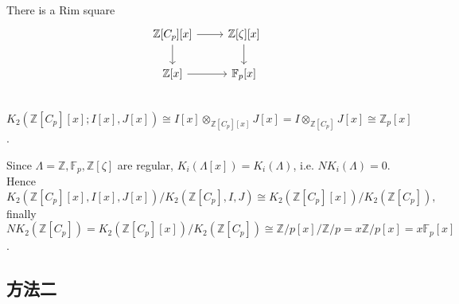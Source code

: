 {\begin{example}[{$\mathbb{Z}[C_p]$}]
\end{example}
\begin{example}[{$\mathbb{Z}[C_p][x]$}]
	There is a Rim square
		\[\begin{tikzcd}
			\mathbb{Z}[C_p][x] \ar[r] \ar[d]& \mathbb{Z}[\zeta][x]\ar[d]\\
			\mathbb{Z}[x] \ar[r] & \mathbb{F}_p[x]\\
		\end{tikzcd}\]
$K_2(\mathbb{Z}[C_p][x];I[x],J[x])\cong I[x]\otimes_{\mathbb{Z}[C_p][x]} J[x] =I\otimes_{\mathbb{Z}[C_p]} J[x]\cong \mathbb{Z}_p[x]$.

Since $\Lambda=\mathbb{Z}, \mathbb{F}_p, \mathbb{Z}[\zeta]$ are regular, $K_i(\Lambda[x]) = K_i(\Lambda)$, i.e. $NK_i(\Lambda)=0$. Hence 
\[K_2(\mathbb{Z}[C_p][x],I[x],J[x])/K_2(\mathbb{Z}[C_p],I,J)\cong K_2(\mathbb{Z}[C_p][x])/K_2(\mathbb{Z}[C_p]),\]
finally $NK_2(\mathbb{Z}[C_p]) = K_2(\mathbb{Z}[C_p][x])/K_2(\mathbb{Z}[C_p]) \cong \mathbb{Z}/p[x]/\mathbb{Z}/p=x \mathbb{Z}/p [x]= x \mathbb{F}_p[x]$.
\end{example}
}









\subsection{{\color{red}方法二}}

